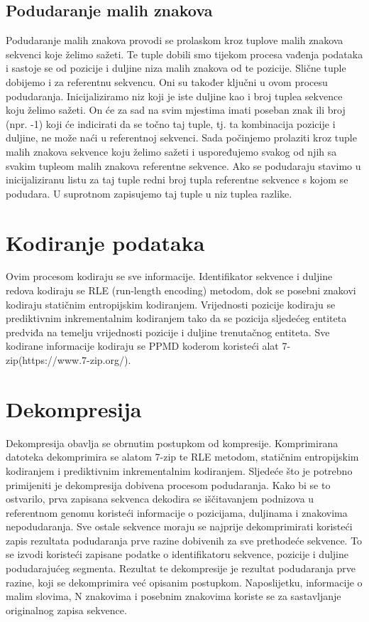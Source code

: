 \subsection{Podudaranje malih znakova}
Podudaranje malih znakova provodi se prolaskom kroz tuplove malih znakova sekvenci koje želimo sažeti. Te tuple dobili smo tijekom procesa vađenja podataka i sastoje se od pozicije i duljine niza malih znakova od te pozicije. Slične tuple dobijemo i za referentnu sekvencu. Oni su također ključni u ovom procesu podudaranja. Inicijaliziramo niz koji je iste duljine kao i broj tuplea sekvence koju želimo sažeti. On će za sad na svim mjestima imati poseban znak ili broj (npr. -1) koji će indicirati da se točno taj tuple, tj. ta kombinacija pozicije i duljine, ne može naći u referentnoj sekvenci. Sada počinjemo prolaziti kroz tuple malih znakova sekvence koju želimo sažeti i uspoređujemo svakog od njih sa svakim tupleom malih znakova referentne sekvence. Ako se podudaraju stavimo u inicijaliziranu listu za taj tuple redni broj tupla referentne sekvence s kojom se podudara. U suprotnom zapisujemo taj tuple u niz tuplea razlike. 

\section{Kodiranje podataka}
Ovim procesom kodiraju se sve informacije. Identifikator sekvence i duljine redova kodiraju se RLE (run-length encoding) metodom, dok se posebni znakovi kodiraju statičnim entropijskim kodiranjem. Vrijednosti pozicije kodiraju se prediktivnim inkrementalnim kodiranjem tako da se pozicija sljedećeg entiteta predviđa na temelju vrijednosti pozicije i duljine trenutačnog entiteta. Sve kodirane informacije kodiraju se PPMD koderom koristeći alat 7-zip(https://www.7-zip.org/).

\section{Dekompresija}
Dekompresija obavlja se obrnutim postupkom od kompresije. Komprimirana datoteka dekomprimira se alatom 7-zip te RLE metodom, statičnim entropijskim kodiranjem i prediktivnim inkrementalnim kodiranjem. Sljedeće što je potrebno primijeniti je dekompresija dobivena procesom podudaranja. Kako bi se to ostvarilo, prva zapisana sekvenca dekodira se iščitavanjem podnizova u referentnom genomu koristeći informacije o pozicijama, duljinama i znakovima nepodudaranja. Sve ostale sekvence moraju se najprije dekomprimirati koristeći zapis rezultata podudaranja prve razine dobivenih za sve prethodeće sekvence. To se izvodi koristeći zapisane podatke o identifikatoru sekvence, pozicije i duljine podudarajućeg segmenta. Rezultat te dekompresije je rezultat podudaranja prve razine, koji se dekomprimira već opisanim postupkom. Naposlijetku, informacije o malim slovima, N znakovima i posebnim znakovima koriste se za sastavljanje originalnog zapisa sekvence.

